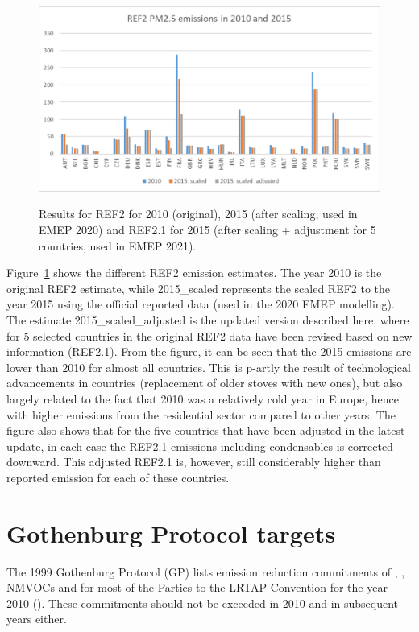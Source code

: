 \begin{figure}[h]
\centering
{\includegraphics*[viewport=1 1 740 400,clip,scale=0.45]{FIGS_CEIP/Fig3.pdf}}
\caption{Results for REF2 for 2010 (original), 2015 (after scaling, used in EMEP 2020) and REF2.1 for 2015 (after scaling + adjustment for 5 countries, used in EMEP 2021).}
\label{fig:CEIP3}
\end{figure}


Figure~\ref{fig:CEIP3} shows the different REF2 emission estimates. The year 2010 is the original REF2 estimate, while 2015\_scaled represents the scaled REF2 to the year 2015 using the official reported data (used in the 2020 EMEP modelling). The estimate 2015\_scaled\_adjusted is the updated version described here, where for 5 selected countries in the original REF2 data have been revised based on new information (REF2.1).
From the figure, it can be seen that the 2015 emissions are lower than 2010 for almost all countries. This is p-artly the result of technological advancements in countries (replacement of older stoves with new ones), but also largely related to the fact that 2010 was a relatively cold year in Europe, hence with higher emissions from the residential sector compared to other years. The figure also shows that for the five countries that have been adjusted in the latest update, in each case the REF2.1 emissions including condensables is corrected downward. This adjusted REF2.1 is, however, still considerably higher than reported emission for each of these countries.

\section{Gothenburg Protocol targets}
\label{sec:GP}

The 1999 Gothenburg Protocol (GP) lists emission reduction commitments of  \nox,
\sox, NMVOCs and \nhiii for most of the Parties to the LRTAP Convention for the year 2010 (\cite{UNECE1999}). These commitments should not be exceeded in 2010 and in subsequent years either.

